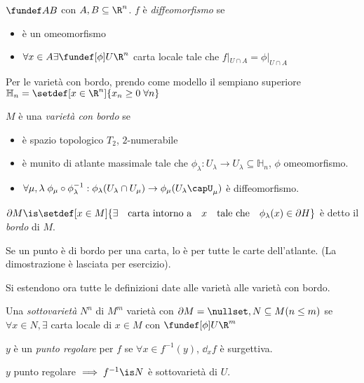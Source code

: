 \begin{defn}
$\fundef AB$ con $A,B\subseteq \R^n$. $f$ è \emph{diffeomorfismo} se
\begin{itemize}
 \item è un omeomorfismo
 \item $\forall x\in A \exists \fundef[\phi] U\R^n$ carta locale tale che $f|_{U\cap A}=\phi|_{U\cap A}$
\end{itemize}
\end{defn}
Per le varietà con bordo, prendo come modello il sempiano superiore $\mathbb H_n=\setdef[x\in\R^n]{x_n\ge 0 \; \forall n}$
\begin{defn}
 $M$ è una \emph{varietà con bordo} se 
 \begin{itemize}
  \item è spazio topologico $T_2$, $2$-numerabile
  \item è munito di atlante massimale tale che $\phi_{\lambda}: U_{\lambda}\rightarrow U_{\lambda}\subseteq\mathbb H_n$, $\phi$ omeomorfismo.
  \item $\forall \mu,\lambda\; \phi_{\mu}\circ\phi_{\lambda}^{-1}:\phi_{\lambda}(U_{\lambda}\cap U_{\mu})\rightarrow\phi_{\mu}(U_{\lambda}\capU_{\mu})$ è diffeomorfismo.
 \end{itemize}
\end{defn}
\begin{defn}[Bordo]
$\partial M\is \setdef[x\in M]{\exists\quad \text{carta intorno a}\quad x \quad\text{tale che}\quad \phi_{\lambda}(x) \in \partial H}$ è detto il \emph{bordo} di $M$.
\end{defn}
\begin{prop}
 Se un punto è di bordo per una carta, lo è per tutte le carte dell'atlante. (La dimostrazione è lasciata per esercizio).
\end{prop}
Si estendono ora tutte le definizioni date alle varietà alle varietà con bordo.
\begin{defn}[Sottovarietà]
 Una \emph{sottovarietà} $N^n$ di $M^m$ varietà con $\partial M = \nullset, N\subseteq M (n\le m)$ se $\forall x\in N, \exists$ carta locale di $x \in M$ con $\fundef[\phi] U\R^m $
\end{defn}
\begin{defn}
 $y$ è un \emph{punto regolare} per $f$ se $\forall x\in f^{-1}(y)$, $\dd_xf$ è surgettiva.
\end{defn}
\begin{prop}
 $y$ punto regolare $\implies f^{-1}\is N$ è sottovarietà di $U$.
\end{prop}
